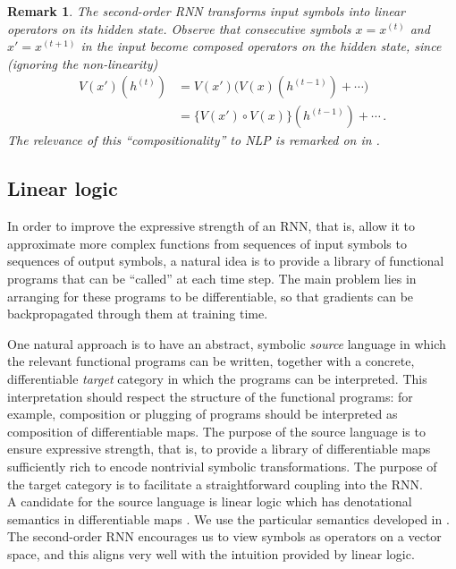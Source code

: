 \documentclass[english,letter paper,12pt,leqno]{article}
\theoremstyle{example}
\newtheorem{remark}[theorem]{Remark}
\numberwithin{equation}{section}
\begin{document}
\begin{remark}
The second-order RNN transforms input symbols into linear operators on its hidden state. Observe that consecutive symbols $x = x^{(t)}$ and $x' = x^{(t+1)}$ in the input become composed operators on the hidden state, since (ignoring the non-linearity)
\begin{align*}
V(x')(h^{(t)}) &= V(x')\big( V(x)(h^{(t-1)}) + \cdots)\\
&= \big\{ V(x') \circ V(x) \big\}( h^{(t-1)} ) + \cdots\,.
\end{align*}
The relevance of this ``compositionality'' to NLP is remarked on in \cite{irsoy}.
\end{remark}

\subsection{Linear logic}

In order to improve the expressive strength of an RNN, that is, allow it to approximate more complex functions from sequences of input symbols to sequences of output symbols, a natural idea is to provide a library of functional programs that can be ``called'' at each time step. The main problem lies in arranging for these programs to be differentiable, so that gradients can be backpropagated through them at training time.

One natural approach is to have an abstract, symbolic \emph{source} language in which the relevant functional programs can be written, together with a concrete, differentiable \emph{target} category in which the programs can be interpreted. This interpretation should respect the structure of the functional programs: for example, composition or plugging of programs should be interpreted as composition of differentiable maps. The purpose of the source language is to ensure expressive strength, that is, to provide a library of differentiable maps sufficiently rich to encode nontrivial symbolic transformations. The purpose of the target category is to facilitate a straightforward coupling into the RNN.
\\

A candidate for the source language is linear logic \cite{girard} which has denotational semantics in differentiable maps \cite{ehrhard-survey}. We use the particular semantics developed in \cite{murfet_logic,murfet_coalg,murfetclift}. The second-order RNN encourages us to view symbols as operators on a vector space, and this aligns very well with the intuition provided by linear logic.
\end{document}

